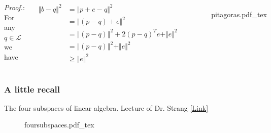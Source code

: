 \documentclass[aspectratio=169]{beamer}
\newcommand{\incfig}[2][1]{%
    \def\svgwidth{#1\columnwidth}
    {#2.pdf_tex} }
\begin{document}
\begin{frame}{} %
	
	\begin{columns}
	
	

{\color{violet} \textit{Proof.}:} For any $q \in \mathcal{L}$ we have

\begin{align*}
	\Vert b-q \Vert^2 &=  \Vert  p + e - q \Vert^2\\ 
	&= \Vert (p - q) + e \Vert^2 \\
	&= \Vert (p - q) \Vert^2  + 2(p-q)^Te+ \Vert e \Vert^2\\ 
	&= \Vert (p - q) \Vert^2 + \Vert e \Vert^2 \\
	& \geq \Vert e \Vert^2
\end{align*}
		
		
\begin{figure}[ht]
    \centering
    \incfig{pitagoras}
    \label{fig:pitagoras}
\end{figure}

\end{columns}

\end{frame}

\begin{frame} %
	\frametitle{A little recall}{The four subspaces of linear algebra. Lecture of Dr. Strang \href{ https://ocw.mit.edu/courses/mathematics/18-06-linear-algebra-spring-2010/video-lectures/lecture-10-the-four-fundamental-subspaces/ }{[Link]}}
 
\begin{figure}[ht]
    \centering
    \incfig[0.9]{foursubspaces}
    \label{fig:foursubspaces}
\end{figure}

\end{frame}
\end{document}
